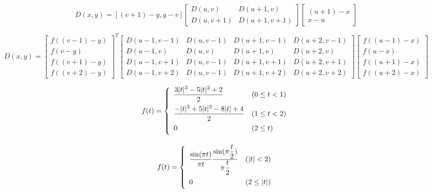 \documentclass{article}
\begin{document}
{\[ D(x,y) = \left[ (v+1)-y, y-v \right] \left[\begin{array}{cc} D(u,v) & D(u+1,v) \\ D(u,v+1) & D(u+1,v+1) \end{array}\right] \left[\begin{array}{c} (u+1) - x \\ x - u \end{array}\right] \]
\pagebreak

\[ D(x,y) = \left[\begin{array}{c} f((v-1)-y) \\ f(v-y) \\ f((v+1)-y) \\ f((v+2)-y) \end{array}\right]^T \left[\begin{array}{cccc} D(u-1,v-1) & D(u,v-1) & D(u+1,v-1) & D(u+2,v-1) \\ D(u-1,v) & D(u,v) & D(u+1,v) & D(u+2,v) \\ D(u-1,v+1) & D(u,v-1) & D(u+1,v+1) & D(u+2,v+1) \\ D(u-1,v+2) & D(u,v-1) & D(u+1,v+2) & D(u+2,v+2) \end{array}\right] \left[\begin{array}{c} f((u-1)-x) \\ f(u-x) \\ f((u+1)-x) \\ f((u+2)-x) \end{array}\right] \]
\pagebreak

\[ f(t) = \left\{ \begin{array}{ll} \dfrac{3|t|^3-5|t|^2+2}{2} & (0 \le t<1) \vspace{.5em} \\ \dfrac{-|t|^3+5|t|^2-8|t|+4}{2} & (1 \le t<2) \vspace{.5em} \\ 0 & (2 \le t) \vspace{.5em} \\ \end{array} \right. \]
\pagebreak

\[ f(t) = \left\{ \begin{array}{ll} \dfrac{\sin(\pi t)}{\pi t}\dfrac{\sin(\pi \dfrac{t}{2})}{\pi \dfrac{t}{2} } & (|t| < 2) \vspace{.5em} \\ 0 & (2 \le |t|) \vspace{.5em} \\ \end{array} \right. \]
\pagebreak

}
\end{document}
